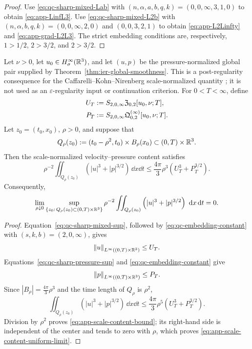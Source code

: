 \begin{proof}
Use \eqref{eq:qc-sharp-mixed-Lab} with
\((n,\alpha,a,b,q,k)=(0,0,\infty,3,1,0)\) to obtain
\eqref{eq:app-LinfL3}.  Use \eqref{eq:qc-sharp-mixed-L2b} with
\((n,\alpha,b,q,k)=(0,0,\infty,2,0)\) and
\((0,0,3,2,1)\) to obtain \eqref{eq:app-L2Linfty} and
\eqref{eq:app-grad-L2L3}.  The strict embedding conditions are,
respectively, \(1>1/2\), \(2>3/2\), and \(2>3/2\).
\end{proof}

\begin{corollary}
\label{thm:app-scale-content-extinction}
Let \(\nu>0\), let \(u_0\in H^\infty_\sigma(\mathbb R^3)\), and let \((u,p)\) be
the pressure-normalized global pair supplied by
Theorem~\ref{thm:ier-global-smoothness}.  This is a post-regularity
consequence for the Caffarelli--Kohn--Nirenberg scale-normalized quantity
\cite{CKN1982}; it is not used as an \(\varepsilon\)-regularity input or
continuation criterion.
For \(0<T<\infty\), define
\begin{align}
 U_T&:=S_{2,0,\infty}\mathfrak Z_{0,2}[u_0,\nu;T],\notag\\
 P_T&:=S_{2,0,\infty}
 \mathfrak Q^{(\infty)}_{0,2}[u_0,\nu;T].
 \label{eq:app-scale-content-majorants}
\end{align}
Let \(z_0=(t_0,x_0)\), \(\rho>0\), and suppose that
\[
 Q_\rho(z_0):=(t_0-\rho^2,t_0)\times B_\rho(x_0)
 \subset(0,T)\times\mathbb R^3.
\]
Then the scale-normalized velocity--pressure content satisfies
\begin{equation}
 \rho^{-2}\iint_{Q_\rho(z_0)}
 \left(|u|^3+|p|^{3/2}\right)\,\dd x\dd t
 \le\frac{4\pi}{3}\rho^3
 \left(U_T^3+P_T^{3/2}\right).
 \label{eq:app-scale-content-bound}
\end{equation}
Consequently,
\begin{equation}
 \lim_{\rho\downarrow0}
 \sup_{\{z_0:\,Q_\rho(z_0)\subset(0,T)\times\mathbb R^3\}}
 \rho^{-2}\iint_{Q_\rho(z_0)}
 \left(|u|^3+|p|^{3/2}\right)\,\,\mathrm d x\,\mathrm d t=0.
 \label{eq:app-scale-content-uniform-limit}
\end{equation}
\end{corollary}

\begin{proof}
Equation~\eqref{eq:qc-sharp-mixed-sup}, followed by
\eqref{eq:qc-embedding-constant} with \((s,k,b)=(2,0,\infty)\), gives
\[
 \left\lVert u\right\rVert_{L^\infty((0,T)\times\mathbb R^3)}\le U_T.
\]
Equations~\eqref{eq:qc-sharp-pressure-sup} and
\eqref{eq:qc-embedding-constant} give
\[
 \left\lVert p\right\rVert_{L^\infty((0,T)\times\mathbb R^3)}\le P_T.
\]
Since \(|B_\rho|=\frac{4\pi}{3}\rho^3\) and the time length of
\(Q_\rho\) is \(\rho^2\),
\[
 \iint_{Q_\rho(z_0)}\left(|u|^3+|p|^{3/2}\right)\,\dd x\dd t
 \le\frac{4\pi}{3}\rho^5
 \left(U_T^3+P_T^{3/2}\right).
\]
Division by \(\rho^2\) proves \eqref{eq:app-scale-content-bound}; its
right-hand side is independent of the center and tends to zero with
\(\rho\), which proves \eqref{eq:app-scale-content-uniform-limit}.
\end{proof}


